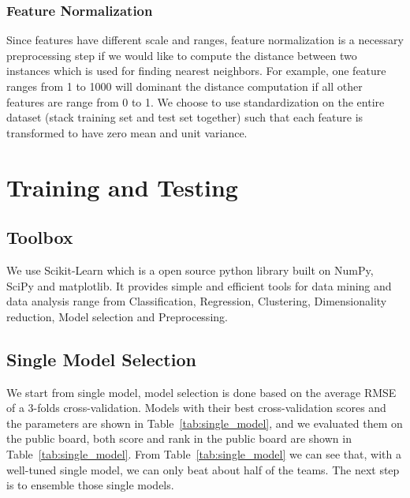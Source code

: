 \documentclass[10pt, oneside]{article}   	%
\newcommand\tabref{Table~\ref}
\begin{document}
\subsubsection{Feature Normalization}
Since features have different scale and ranges, feature normalization is a necessary preprocessing step if we would like to compute the distance between two instances which is used for finding nearest neighbors. 
For example, one feature ranges from 1 to 1000 will dominant the distance computation if all other features are range from 0 to 1.
We choose to use standardization on the entire dataset (stack training set and test set together) such that each feature is transformed to have zero mean and unit variance.

\section{Training and Testing}

\subsection{Toolbox}
We use Scikit-Learn which is a open source python library built on NumPy, SciPy and matplotlib. 
It provides simple and efficient tools for data mining and data analysis range from Classification, Regression, Clustering, Dimensionality reduction, Model selection and Preprocessing.

\subsection{Single Model Selection}
We start from single model, model selection is done based on the average RMSE of a 3-folds cross-validation.
Models with their best cross-validation scores and the parameters are shown in \tabref{tab:single_model}, and we evaluated them on the public board, both score and rank in the public board are shown in \tabref{tab:single_model}.
From \tabref{tab:single_model} we can see that, with a well-tuned single model, we can only beat about half of the teams.
The next step is to ensemble those single models.
\end{document}
